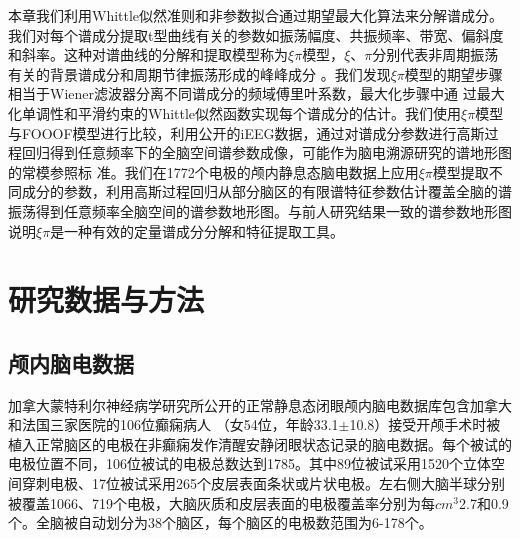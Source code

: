 本章我们利用Whittle似然准则和非参数拟合通过期望最大化算法来分解谱成分。我们对每个谱成分提取t型曲线有关的参数如振荡幅度、共振频率、带宽、偏斜度和斜率。这种对谱曲线的分解和提取模型称为$\xi\pi$模型，$\xi$、$\pi$分别代表非周期振荡有关的背景谱成分和周期节律振荡形成的峰峰成分
。我们发现$\xi\pi$模型的期望步骤相当于Wiener滤波器分离不同谱成分的频域傅里叶系数，最大化步骤中通
过最大化单调性和平滑约束的Whittle似然函数实现每个谱成分的估计。我们使用$\xi\pi$模型与FOOOF模型进行比较，利用公开的iEEG数据，通过对谱成分参数进行高斯过程回归得到任意频率下的全脑空间谱参数成像，可能作为脑电溯源研究的谱地形图的常模参照标
准。我们在1772个电极的颅内静息态脑电数据上应用$\xi\pi$模型提取不同成分的参数，利用高斯过程回归从部分脑区的有限谱特征参数估计覆盖全脑的谱振荡得到任意频率全脑空间的谱参数地形图。与前人研究结果一致的谱参数地形图说明$\xi\pi$是一种有效的定量谱成分分解和特征提取工具。

\section{研究数据与方法}
\subsection{颅内脑电数据}
加拿大蒙特利尔神经病学研究所公开的正常静息态闭眼颅内脑电数据库包含加拿大和法国三家医院的106位癫痫病人
（女54位，年龄33.1$\pm$10.8）接受开颅手术时被植入正常脑区的电极在非癫痫发作清醒安静闭眼状态记录的脑电数据。每个被试的电极位置不同，106位被试的电极总数达到1785。其中89位被试采用1520个立体空间穿刺电极、17位被试采用265个皮层表面条状或片状电极。左右侧大脑半球分别被覆盖1066、719个电极，大脑灰质和皮层表面的电极覆盖率分别为每$cm^3$2.7和0.9个。全脑被自动划分为38个脑区，每个脑区的电极数范围为6-178个。

